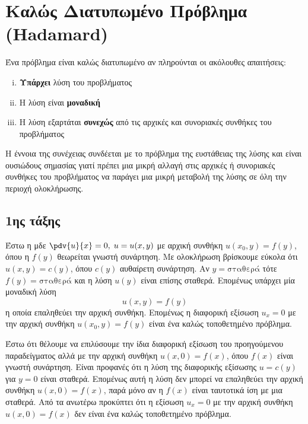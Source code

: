 \section*{Καλώς Διατυπωμένο Πρόβλημα (Hadamard)}

\begin{mybox1}
  \begin{dfn}
    Ένα πρόβλημα είναι \textcolor{Col1}{καλώς διατυπωμένο} αν πληρούνται οι ακόλουθες 
    απαιτήσεις:
    \begin{enumerate}[i)]
      \item \textbf{Υπάρχει} λύση του προβλήματος
      \item Η λύση είναι \textbf{μοναδική}
      \item Η λύση εξαρτάται \textbf{συνεχώς} από τις αρχικές και συνοριακές συνθήκες 
        του προβλήματος
    \end{enumerate}
  \end{dfn}
\end{mybox1}

\begin{rem}
  Η έννοια της συνέχειας συνδέεται με το πρόβλημα της ευστάθειας της λύσης και είναι
  ουσιώδους σημασίας γιατί πρέπει μια μικρή αλλαγή στις αρχικές ή συνοριακές συνθήκες του
  προβλήματος να παράγει μια μικρή μεταβολή της λύσης σε όλη την περιοχή ολοκλήρωσης.
\end{rem}


\subsection*{1ης τάξης}

\begin{example}
  Έστω η μδε $ \pdv{u}{x} = 0, \; u=u(x,y) $ με αρχική συνθήκη $ u(x_{0},y) = f(y) $, 
  όπου η $ f(y) $ θεωρείται γνωστή συνάρτηση. Με ολοκλήρωση βρίσκουμε εύκολα ότι 
  $ u(x,y) = c(y) $, όπου $ c(y) $ αυθαίρετη συνάρτηση. Αν $ y= \text{σταθερά} $ τότε 
  $ f(y)= \text{σταθερά} $ και η λύση $ u(y)$ είναι επίσης σταθερά. Επομένως υπάρχει 
  μία μοναδική λύση 
  \[
    u(x,y)=f(y) 
  \]
  η οποία επαληθεύει την αρχική συνθήκη. Επομένως η διαφορική εξίσωση $ u_{x}=0 $ 
  με την αρχική συνθήκη $ u(x_{0},y) = f(y) $ είναι ένα καλώς τοποθετημένο πρόβλημα.
\end{example}

\begin{example}
  Έστω ότι θέλουμε να επιλύσουμε την ίδια διαφορική εξίσωση του προηγούμενου
  παραδείγματος αλλά με την αρχική συνθήκη $ u(x,0) = f(x) $, όπου $ f(x) $ είναι γνωστή 
  συνάρτηση. 
  Είναι προφανές ότι η λύση της διαφορικής εξίσωσης $ u=c(y) $ για $ y=0 $ είναι 
  σταθερά. Επομένως αυτή η λύση δεν μπορεί να επαληθεύει την αρχική συνθήκη $ u(x,0) = f(x)
  $, παρά μόνο αν η $ f(x) $ είναι ταυτοτικά ίση με μια σταθερά. Από τα ανωτέρω 
  προκύπτει ότι η εξίσωση $ u_{x}=0 $ με την αρχική συνθήκη $ u(x,0)=f(x) $ δεν είναι 
  ένα καλώς τοποθετημένο πρόβλημα.
\end{example}



